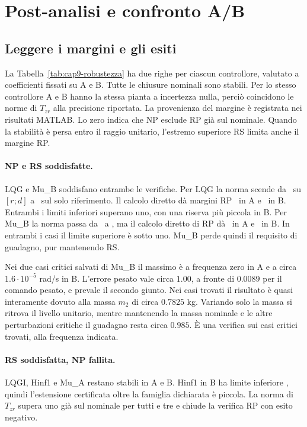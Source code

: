 \section{Post-analisi e confronto A/B}

\subsection{Leggere i margini e gli esiti}

La Tabella~\ref{tab:cap9-robustezza} ha due righe per ciascun
controllore, valutato a coefficienti fissati su A e B. Tutte le
chiusure nominali sono stabili. Per lo stesso controllore A e B
hanno la stessa pianta a incertezza nulla, perciò coincidono le
norme di $T_{zr}$ alla precisione riportata. La provenienza del
margine è registrata nei risultati MATLAB. Lo zero indica
che NP esclude RP già sul nominale. Quando la stabilità è persa
entro il raggio unitario, l'estremo superiore RS limita anche
il margine RP.



\paragraph{NP e RS soddisfatte.}
LQG e Mu\_B soddisfano entrambe le verifiche. Per LQG la norma scende da
\FinLQGNorma\ su $[r;d]$ a \FinLQGNormaR\ sul solo riferimento.
Il calcolo diretto dà margini RP \FinLQGIntervalloRPRA\ in A
e \FinLQGIntervalloRPRB\ in B. Entrambi i limiti inferiori
superano uno, con una riserva più piccola in B. Per Mu\_B la norma
passa da \FinMuBNorma\ a \FinMuBNormaR, ma il calcolo diretto di RP
dà \FinMuBIntervalloRPRA\ in A e \FinMuBIntervalloRPRB\ in B.
In entrambi i casi il limite superiore è sotto uno. Mu\_B perde
quindi il requisito di guadagno, pur mantenendo RS.

Nei due casi critici salvati di Mu\_B il massimo è a frequenza
zero in A e a circa $1.6\cdot10^{-5}$ rad/s in B. L'errore
pesato vale circa $1.00$, a fronte di $0.0089$ per il comando
pesato, e prevale il secondo giunto. Nei casi trovati il risultato
è quasi interamente dovuto alla massa $m_2$ di circa $0.7825$ kg.
Variando solo la massa si ritrova il livello unitario, mentre
mantenendo la massa nominale e le altre perturbazioni critiche
il guadagno resta circa $0.985$. È una verifica sui casi critici
trovati, alla frequenza indicata.

\paragraph{RS soddisfatta, NP fallita.}
LQGI, Hinf1 e Mu\_A restano stabili in A e B. Hinf1 in B
ha limite inferiore \FinHinfOneRSB, quindi l'estensione
certificata oltre la famiglia dichiarata è piccola. La norma di
$T_{zr}$ supera uno già sul nominale per tutti e tre e chiude
la verifica RP con esito negativo.

